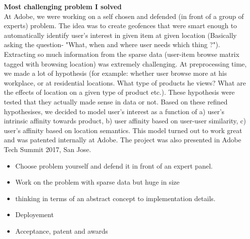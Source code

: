 \textbf{Most challenging problem I solved} \\
At Adobe, we were working on a self chosen and defended (in front of a group of experts) problem. The idea was to create geofences that were smart enough to automatically identify user's interest in given item at given location (Basically asking the question- "What, when and where user needs which thing ?"). Extracting so much information from the sparse data (user-item browse matrix tagged with browsing location) was extremely challenging. At preprocessing time, we made a lot of hypothesis (for example: whether user browse more at his workplace, or at residential locations. What type of products he views? What are the effects of location on a given type of product etc.). These hypothesis were tested that they actually made sense in data or not. 
Based on these refined hypothesises, we decided to model user's interest as a function of a) user's intrinsic affinity towards product, b) user affinity based on user-user similarity, c) user's affinity based on location semantics. 
This model turned out to work great and was patented internally at Adobe. The project was also presented in Adobe Tech Summit 2017, San Jose. \\  
\begin{itemize}
	\item Choose problem yourself and defend it in front of an expert panel.
	\item Work on the problem with sparse data but huge in size
	\item thinking in terms of an abstract concept to implementation details. 
	\item Deployement
	\item Acceptance, patent and awards
\end{itemize}

